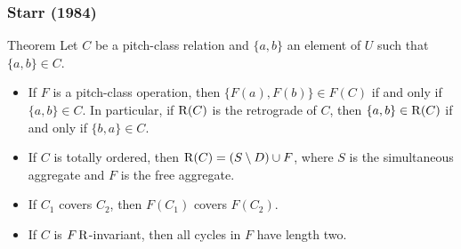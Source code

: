 \begin{frame}
	\frametitle{Starr (1984)}
	\begin{block}{Theorem}
		Let $C$ be a pitch-class relation and $\{ a, b \}$ an element of $U$ such that $\{ a, b \} \in C$.
    	\begin{itemize}
        	\item If $F$ is a pitch-class operation, then $\{ F(a), F(b) \} \in F(C)$ if and only if $\{ a, b \} \in C$. In particular, if $\operatorname{R}(C)$ is the retrograde of $C$, then $\{ a, b \} \in \operatorname{R}(C)$ if and only if $\{ b, a \} \in C$.
        	\item If $C$ is totally ordered, then $\operatorname{R}(C) = (S \setminus D) \cup F$, where $S$ is the simultaneous aggregate and $F$ is the free aggregate.
        	\item If $C_1$ covers $C_2$, then $F(C_1)$ covers $F(C_2)$.
        	\item If $C$ is $F\operatorname{R}$-invariant, then all cycles in $F$ have length two.
    	\end{itemize}
	\end{block}
\end{frame}
